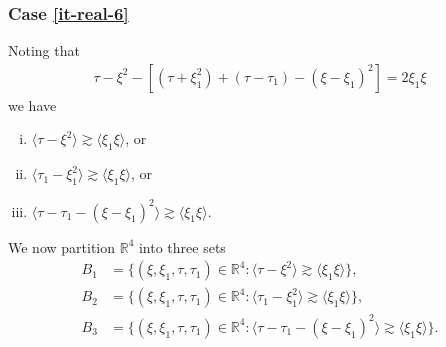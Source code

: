 \documentclass[12pt,reqno]{amsart}
\numberwithin{equation}{section}  %
\numberwithin{figure}{section}
\newcommand{\rr}{\mathbb{R}}
\theoremstyle{plain}
\theoremstyle{definition}
\theoremstyle{remark}
\begin{document}
 \subsubsection{Case \eqref{it-real-6}} 
\label{sssec:case-it-real-6}
Noting that 
%
%
\begin{equation*}
\begin{split}
  \tau - \xi^{2} - \left[ (\tau + \xi_{1}^{2}) + (\tau - \tau_{1}) - (\xi -
  \xi_{1})^{2} \right] = 2\xi_{1}\xi
\end{split}
\end{equation*}
%
%
we have 
%
%
\begin{enumerate}[(i)]
  \item{$\langle \tau - \xi^{2} \rangle  \gtrsim \langle \xi_{1}\xi \rangle$, or}
    \\
  \item{  $\langle \tau_{1} - \xi_{1}^{2} \rangle  \gtrsim \langle \xi_{1}\xi \rangle$, or}
    \\
  \item{ $\langle \tau - \tau_{1} - (\xi - \xi_{1})^{2} \rangle  \gtrsim \langle \xi_{1}\xi
    \rangle$}.
\end{enumerate}
%
%
We now partition $\rr^{4}$ into three sets 
%
%
%
\begin{align*}
B_1&=\{(\xi, \xi_1, \tau, \tau_1)\in \rr^4: \langle \tau - \xi^{2} \rangle
\gtrsim \langle \xi_{1}\xi \rangle\},\\
B_2&=\{(\xi, \xi_1, \tau, \tau_1)\in \rr^4: \langle \tau_{1} - \xi_{1}^{2} \rangle  \gtrsim \langle \xi_{1}\xi \rangle \},\\
B_3&=\{(\xi, \xi_1, \tau, \tau_1)\in \rr^4: \langle \tau - \tau_{1} - (\xi -
\xi_{1})^{2} \rangle  \gtrsim \langle \xi_{1}\xi \rangle \}.
\end{align*} 
\end{document}
